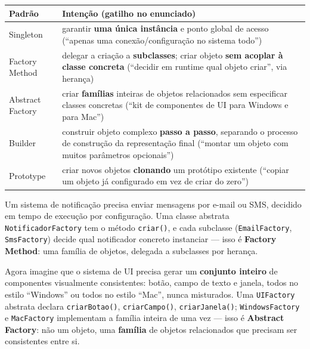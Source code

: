 \begin{conceito}
\begin{center}
\begin{tabular}{@{}p{2.8cm}p{9cm}@{}}
\toprule
\textbf{Padrão} & \textbf{Intenção (gatilho no enunciado)} \\
\midrule
Singleton & garantir \textbf{uma única instância} e ponto global de acesso
(“apenas uma conexão/configuração no sistema todo”) \\
Factory Method & delegar a criação a \textbf{subclasses}; criar objeto
\textbf{sem acoplar à classe concreta} (“decidir em runtime qual objeto
criar”, via herança) \\
Abstract Factory & criar \textbf{famílias} inteiras de objetos relacionados
sem especificar classes concretas (“kit de componentes de UI para Windows e
para Mac”) \\
Builder & construir objeto complexo \textbf{passo a passo}, separando o
processo de construção da representação final (“montar um objeto com
muitos parâmetros opcionais”) \\
Prototype & criar novos objetos \textbf{clonando} um protótipo existente
(“copiar um objeto já configurado em vez de criar do zero”) \\
\bottomrule
\end{tabular}
\end{center}
\end{conceito}

\begin{exemplo}
Um sistema de notificação precisa enviar mensagens por e-mail ou SMS,
decidido em tempo de execução por configuração. Uma classe abstrata
\texttt{NotificadorFactory} tem o método \texttt{criar()}, e cada subclasse
(\texttt{EmailFactory}, \texttt{SmsFactory}) decide qual notificador
concreto instanciar --- isso é \textbf{Factory Method}: uma família de
objetos, delegada a subclasses por herança.

Agora imagine que o sistema de UI precisa gerar um \textbf{conjunto
inteiro} de componentes visualmente consistentes: botão, campo de texto e
janela, todos no estilo “Windows” ou todos no estilo “Mac”, nunca
misturados. Uma \texttt{UIFactory} abstrata declara \texttt{criarBotao()},
\texttt{criarCampo()}, \texttt{criarJanela()}; \texttt{WindowsFactory} e
\texttt{MacFactory} implementam a família inteira de uma vez --- isso é
\textbf{Abstract Factory}: não um objeto, uma \textbf{família} de objetos
relacionados que precisam ser consistentes entre si.
\end{exemplo}

